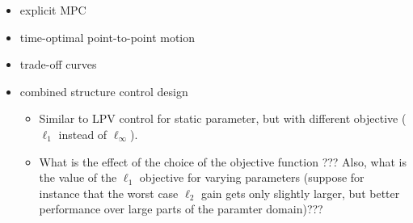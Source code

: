 \documentclass{article}
\begin{document}
\begin{itemize}
\item explicit MPC
\item time-optimal point-to-point motion
\item trade-off curves
\item combined structure control design
    \begin{itemize}
    \item Similar to LPV control for static parameter, but with different objective ($\ell_1$ instead of $\ell_\infty$).
    \item What is the effect of the choice of the objective function ??? Also, what is the value of the $\ell_1$ objective for varying parameters (suppose for instance that the worst case $\ell_2$ gain gets only slightly larger, but better performance over large parts of the paramter domain)???
    \end{itemize}
\end{itemize}



%
%
\end{document}
